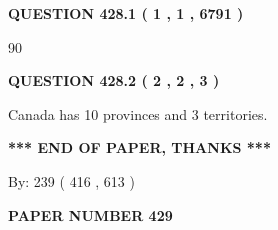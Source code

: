 \documentclass[12pt]{article}
\begin{document}
 
 
 
   
   
  
\vspace{0.2in}
  
{\textbf{\Large{QUESTION
428.1 
 ( 1 , 1 , 6791 )
}}}
  
  
 
 
\noindent{}

90
 
 
  
\vspace{0.2in}
  
{\textbf{\Large{QUESTION
428.2 
 ( 2 , 2 , 3 )
}}}
  
  
 
 
\noindent{}
 
 
Canada has 10  provinces and 3 territories.
 
 
 
 
   
   
 \vspace{0.2in}
 
   
   
   
   
\vspace{1.0in} 
{\textbf{\large{ *** END OF PAPER, THANKS *** }}} 
   
   
\hspace{1.0in} By: 
 239 ( 416 ,  613 )
   
   
   
   
\newpage 
\setcounter{page}{ 
   429001 } 
   
   
   
   
 {\textbf{ \Large{ PAPER NUMBER  429  }}}
   
   
\vspace{0.2in}
   
   
   
   
   
   
 \vspace{0.2in}
 
 
 
 
   
   
  
\vspace{0.2in}
  
\end{document}
